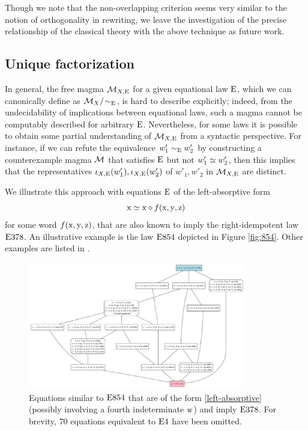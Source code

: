 Though we note that the non-overlapping criterion seems very similar to the notion of orthogonality in rewriting, we leave the investigation of the precise relationship of the classical theory with the above technique as future work.

\subsection{Unique factorization}

In general, the free magma ${\mathcal{M}}_{X,\mathrm{E}}$ for a given equational law $\mathrm{E}$, which we can canonically define as ${\mathcal{M}}_X/\!\sim_{\mathrm{E}}$, is hard to describe explicitly; indeed, from the undecidability of implications between equational laws, such a magma cannot be computably described for arbitrary $\mathrm{E}$.  Nevertheless, for some laws it is possible to obtain some partial understanding of ${\mathcal{M}}_{X,\mathrm{E}}$ from a syntactic perspective.  For instance, if we can refute the equivalence $w'_1 \sim_{\mathrm{E}} w'_2$ by constructing a counterexample magma ${\mathcal{M}}$ that satisfies $\mathrm{E}$ but not $w'_1 \simeq w'_2$, then this implies that the representatives $\iota_{X,\mathrm{E}}(w'_1), \iota_{X,\mathrm{E}}(w'_2)$ of  $w'_1, w'_2$ in ${\mathcal{M}}_{X,\mathrm{E}}$ are distinct.

We illustrate this approach with equations $\mathrm{E}$ of the left-absorptive form
\begin{equation}\label{left-absorptive}
\mathrm{x} \simeq \mathrm{x} \diamond f(\mathrm{x},\mathrm{y},\mathrm{z})
\end{equation}
for some word $f(\mathrm{x},\mathrm{y},\mathrm{z})$, that are also known to imply the right-idempotent law $\mathrm{E}378$.  An illustrative example is the law $\mathrm{E}854$ depicted in Figure \ref{fig:854}. Other examples are listed in .

\begin{figure}
  \centering
  \includegraphics[width=0.85\textwidth]{854-like.png}
  \caption{Equations similar to $\mathrm{E}854$ that are of the form \eqref{left-absorptive} (possibly involving a fourth indeterminate $\mathrm{w}$) and imply $\mathrm{E}378$.  For brevity, $70$ equations equivalent to $\mathrm{E}4$ have been omitted.}
  \label{fig:854-like}
  \end{figure}



